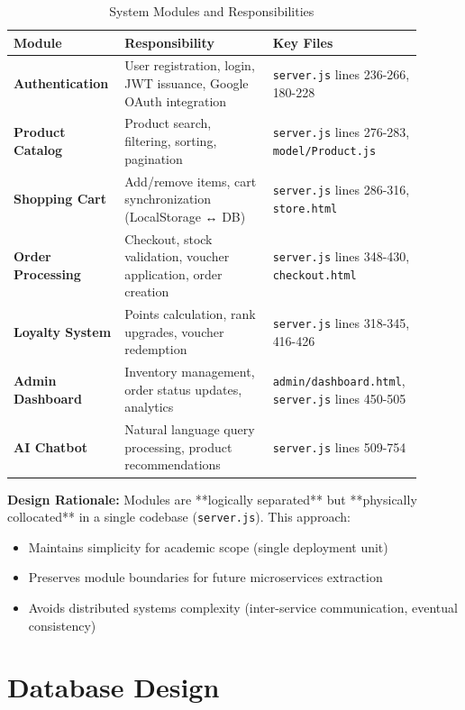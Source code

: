 \begin{table}[H]
\centering
\caption{System Modules and Responsibilities}
\label{tab:modules}
\begin{tabular}{@{}p{0.25\linewidth}p{0.35\linewidth}p{0.30\linewidth}@{}}
\toprule
\textbf{Module} & \textbf{Responsibility} & \textbf{Key Files} \\
\midrule
\textbf{Authentication} & User registration, login, JWT issuance, Google OAuth integration & \texttt{server.js} lines 236-266, 180-228 \\
\textbf{Product Catalog} & Product search, filtering, sorting, pagination & \texttt{server.js} lines 276-283, \texttt{model/Product.js} \\
\textbf{Shopping Cart} & Add/remove items, cart synchronization (LocalStorage ↔ DB) & \texttt{server.js} lines 286-316, \texttt{store.html} \\
\textbf{Order Processing} & Checkout, stock validation, voucher application, order creation & \texttt{server.js} lines 348-430, \texttt{checkout.html} \\
\textbf{Loyalty System} & Points calculation, rank upgrades, voucher redemption & \texttt{server.js} lines 318-345, 416-426 \\
\textbf{Admin Dashboard} & Inventory management, order status updates, analytics & \texttt{admin/dashboard.html}, \texttt{server.js} lines 450-505 \\
\textbf{AI Chatbot} & Natural language query processing, product recommendations & \texttt{server.js} lines 509-754 \\
\bottomrule
\end{tabular}
\end{table}

\textbf{Design Rationale:} Modules are **logically separated** but **physically collocated** in a single codebase (\texttt{server.js}). This approach:
\begin{itemize}
    \item Maintains simplicity for academic scope (single deployment unit)
    \item Preserves module boundaries for future microservices extraction
    \item Avoids distributed systems complexity (inter-service communication, eventual consistency)
\end{itemize}

\section{Database Design}

